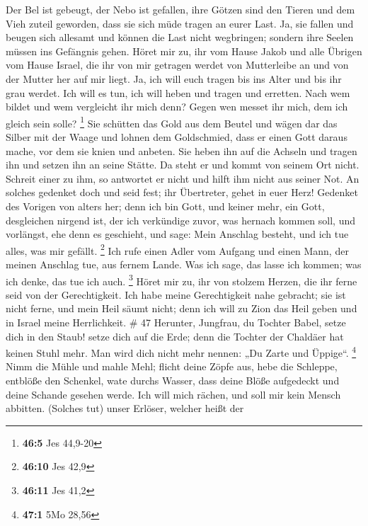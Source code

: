  Der Bel ist gebeugt, der Nebo ist gefallen, ihre Götzen
sind den Tieren und dem Vieh zuteil geworden, dass sie sich müde tragen
an eurer Last.  Ja, sie fallen und beugen sich allesamt
und können die Last nicht wegbringen; sondern ihre Seelen müssen ins
Gefängnis gehen.  Höret mir zu, ihr vom Hause Jakob und
alle Übrigen vom Hause Israel, die ihr von mir getragen werdet von
Mutterleibe an und von der Mutter her auf mir liegt.  Ja,
ich will euch tragen bis ins Alter und bis ihr grau werdet. Ich will es
tun, ich will heben und tragen und erretten.  Nach wem
bildet und wem vergleicht ihr mich denn? Gegen wen messet ihr mich, dem
ich gleich sein solle? \footnote{\textbf{46:5} Jes 44,9-20}
 Sie schütten das Gold aus dem Beutel und wägen dar das
Silber mit der Waage und lohnen dem Goldschmied, dass er einen Gott
daraus mache, vor dem sie knien und anbeten.  Sie heben
ihn auf die Achseln und tragen ihn und setzen ihn an seine Stätte. Da
steht er und kommt von seinem Ort nicht. Schreit einer zu ihm, so
antwortet er nicht und hilft ihm nicht aus seiner Not.  An
solches gedenket doch und seid fest; ihr Übertreter, gehet in euer Herz!
 Gedenket des Vorigen von alters her; denn ich bin Gott,
und keiner mehr, ein Gott, desgleichen nirgend ist,  der
ich verkündige zuvor, was hernach kommen soll, und vorlängst, ehe denn
es geschieht, und sage: Mein Anschlag besteht, und ich tue alles, was
mir gefällt. \footnote{\textbf{46:10} Jes 42,9}  Ich rufe
einen Adler vom Aufgang und einen Mann, der meinen Anschlag tue, aus
fernem Lande. Was ich sage, das lasse ich kommen; was ich denke, das tue
ich auch. \footnote{\textbf{46:11} Jes 41,2}  Höret mir
zu, ihr von stolzem Herzen, die ihr ferne seid von der Gerechtigkeit.
 Ich habe meine Gerechtigkeit nahe gebracht; sie ist
nicht ferne, und mein Heil säumt nicht; denn ich will zu Zion das Heil
geben und in Israel meine Herrlichkeit. \# 47  Herunter,
Jungfrau, du Tochter Babel, setze dich in den Staub! setze dich auf die
Erde; denn die Tochter der Chaldäer hat keinen Stuhl mehr. Man wird dich
nicht mehr nennen: „Du Zarte und Üppige``. \footnote{\textbf{47:1} 5Mo
  28,56}  Nimm die Mühle und mahle Mehl; flicht deine
Zöpfe aus, hebe die Schleppe, entblöße den Schenkel, wate durchs Wasser,
 dass deine Blöße aufgedeckt und deine Schande gesehen
werde. Ich will mich rächen, und soll mir kein Mensch abbitten.
 (Solches tut) unser Erlöser, welcher heißt der
